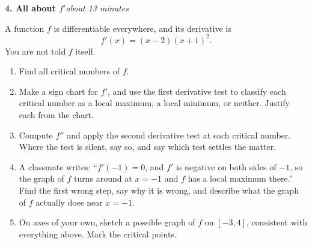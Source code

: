 \documentclass[11pt]{article}
\newcommand{\prob}[2]{\medskip\noindent\textbf{\large #1}\hfill\textit{#2}\par\smallskip}
\begin{document}
\prob{4. All about $f'$}{about 13 minutes}
A function $f$ is differentiable everywhere, and its derivative is
\[
f'(x) = (x-2)(x+1)^2 .
\]
You are not told $f$ itself.
\begin{enumerate}
\item Find all critical numbers of $f$.
\item Make a sign chart for $f'$, and use the first derivative test to classify each
critical number as a local maximum, a local minimum, or neither. Justify each from the
chart.
\item Compute $f''$ and apply the second derivative test at each critical number. Where
the test is silent, say so, and say which test settles the matter.
\item A classmate writes: ``$f'(-1)=0$, and $f'$ is negative on both sides of $-1$, so the
graph of $f$ turns around at $x=-1$ and $f$ has a local maximum there.'' Find the first
wrong step, say why it is wrong, and describe what the graph of $f$ actually does near
$x=-1$.
\item On axes of your own, sketch a possible graph of $f$ on $[-3,4]$, consistent with
everything above. Mark the critical points.
\end{enumerate}
\end{document}

